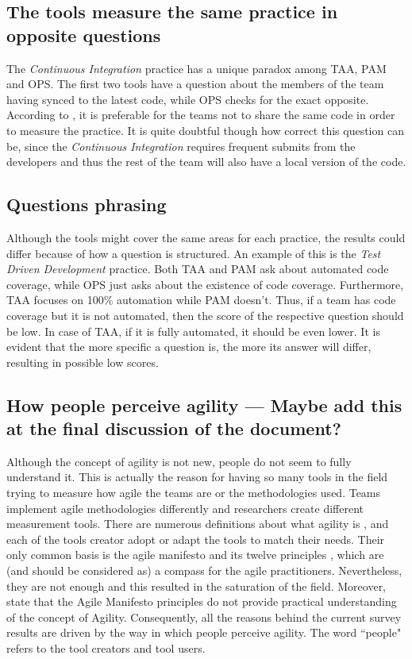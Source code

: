 \subsection{The tools measure the same practice in opposite questions}
\label{subsec:opposite_questions}
The \textit{Continuous Integration} practice has a unique paradox among \ac{TAA}, \ac{PAM} and \ac{OPS}. The first two tools have a question about the members of the team having synced to the latest code, while \ac{OPS} checks for the exact opposite. According to \citet{sventha_dissertation}, it is preferable for the teams not to share the same code in order to measure the practice. It is quite doubtful though how correct this question can be, since the \textit{Continuous Integration} requires frequent submits from the developers and thus the rest of the team will also have a local version of the code.

\subsection{Questions phrasing}
Although the tools might cover the same areas for each practice, the results could differ because of how a question is structured. An example of this is the \textit{Test Driven Development} practice. Both \ac{TAA} and \ac{PAM} ask about automated code coverage, while \ac{OPS} just asks about the existence of code coverage. Furthermore, \ac{TAA} focuses on 100\% automation while \ac{PAM} doesn’t. Thus, if a team has code coverage but it is not automated, then the score of the respective question should be low. In case of \ac{TAA}, if it is fully automated, it should be even lower. It is evident that the more specific a question is, the more its answer will differ, resulting in possible low scores.

\subsection{How people perceive agility --- Maybe add this at the final discussion of the document?}
Although the concept of agility is not new, people do not seem to fully understand it. This is actually the reason for having so many tools in the field trying to measure how agile the teams are or the methodologies used. Teams implement agile methodologies differently and researchers create different measurement tools. There are numerous definitions about what agility is \cite{Kidd, NagelDove, Kara, Ramesh}, and each of the tools creator adopt or adapt the tools to match their needs. Their only common basis is the agile manifesto \cite{beck2001agile} and its twelve principles \cite{agile_principles}, which are (and should be considered as) a compass for the agile practitioners. Nevertheless, they are not enough and this resulted in the saturation of the field. Moreover, \citet{conboy_fitzgerald} state that the Agile Manifesto principles do not provide practical understanding of the concept of Agility. Consequently, all the reasons behind the current survey results are driven by the way in which people perceive agility. The word ``people" refers to the tool creators and tool users.


